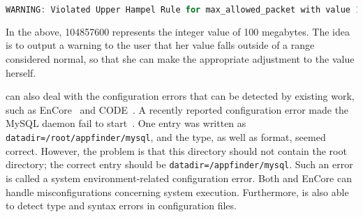 \begin{lstlisting}[language=C, xleftmargin=.01\textwidth]
WARNING: Violated Upper Hampel Rule for max_allowed_packet with value 104857600 
\end{lstlisting} 

In the above, 104857600 represents the integer value of 100 megabytes. The idea is to output
a warning to the user that her value falls outside of a range considered normal, so that she
can make the appropriate adjustment to the value herself.

\app can also deal with the configuration errors that can be detected by
existing work, such as EnCore~\cite{zhang14encore} and
CODE~\cite{yuan11context}.
A recently reported configuration error made the MySQL
daemon fail to start~\cite{syserror}.
One entry was written as 
{\tt datadir=/root/appfinder/mysql}, and the type, as well as 
format, seemed correct.
However, the problem is that this directory should not 
contain the root directory; the correct entry
should be {\tt datadir=/appfinder/mysql}.
Such an error is called a system environment-related configuration error.
Both \app and EnCore can handle misconfigurations concerning system execution.
Furthermore, \app is also able to detect type and syntax errors
in configuration files.
